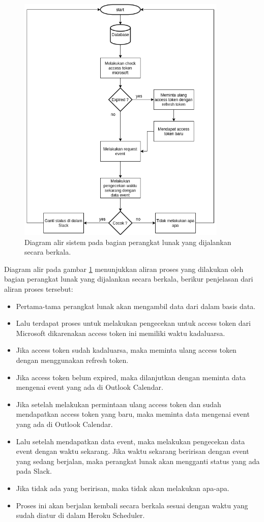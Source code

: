 \begin{figure}[h]
  \includegraphics[width=10cm]{./Gambar/workflow2.png}
  \centering
  \caption{Diagram alir sistem pada bagian perangkat lunak yang dijalankan secara berkala.}
  \label{fig:workflow2}
\end{figure}

Diagram alir pada gambar \ref{fig:workflow2} menunjukkan aliran proses yang dilakukan oleh bagian perangkat lunak yang dijalankan secara berkala, berikur penjelasan dari aliran proses tersebut:
\begin{itemize}
    \item Pertama-tama perangkat lunak akan mengambil data dari dalam basis data. 
    \item Lalu terdapat proses untuk melakukan pengecekan untuk access token dari Microsoft dikarenakan access token ini memiliki waktu kadaluarsa. 
    \item Jika access token sudah kadaluarsa, maka meminta ulang access token dengan menggunakan refresh token.
    \item Jika access token belum expired, maka dilanjutkan dengan meminta data mengenai event yang ada di Outlook Calendar. 
    \item Jika setelah melakukan permintaan ulang access token dan sudah mendapatkan access token yang baru, maka meminta data mengenai event yang ada di Outlook Calendar. 
    \item Lalu setelah mendapatkan data event, maka melakukan pengecekan data event dengan waktu sekarang. Jika waktu sekarang beririsan dengan event yang sedang berjalan, maka perangkat lunak akan mengganti status yang ada pada Slack. 
    \item Jika tidak ada yang beririsan, maka tidak akan melakukan apa-apa. 
    \item Proses ini akan berjalan kembali secara berkala sesuai dengan waktu yang sudah diatur di dalam Heroku Scheduler. 
\end{itemize}

